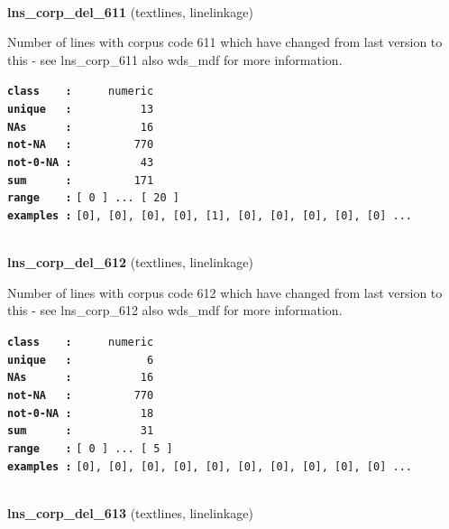 \documentclass[]{article}
\begin{document}
~

\textbf{lns\_corp\_del\_611} (textlines, linelinkage)

Number of lines with corpus code 611 which have changed from last
version to this - see lns\_corp\_611 also wds\_mdf for more information.

\textbf{\texttt{class\ \ \ \ :}} \texttt{~~~~~numeric}\\
\textbf{\texttt{unique\ \ \ :}} \texttt{~~~~~~~~~~13}\\
\textbf{\texttt{NAs\ \ \ \ \ \ :}} \texttt{~~~~~~~~~~16}\\
\textbf{\texttt{not-NA\ \ \ :}} \texttt{~~~~~~~~~770}\\
\textbf{\texttt{not-0-NA\ :}} \texttt{~~~~~~~~~~43}\\
\textbf{\texttt{sum\ \ \ \ \ \ :}} \texttt{~~~~~~~~~171}\\
\textbf{\texttt{range\ \ \ \ :}}
\texttt{{[}\ 0\ {]}\ ...\ {[}\ 20\ {]}}\\
\textbf{\texttt{examples\ :}}
\texttt{{[}0{]},\ {[}0{]},\ {[}0{]},\ {[}0{]},\ {[}1{]},\ {[}0{]},\ {[}0{]},\ {[}0{]},\ {[}0{]},\ {[}0{]}\ ...}\\

~

\textbf{lns\_corp\_del\_612} (textlines, linelinkage)

Number of lines with corpus code 612 which have changed from last
version to this - see lns\_corp\_612 also wds\_mdf for more information.

\textbf{\texttt{class\ \ \ \ :}} \texttt{~~~~~numeric}\\
\textbf{\texttt{unique\ \ \ :}} \texttt{~~~~~~~~~~~6}\\
\textbf{\texttt{NAs\ \ \ \ \ \ :}} \texttt{~~~~~~~~~~16}\\
\textbf{\texttt{not-NA\ \ \ :}} \texttt{~~~~~~~~~770}\\
\textbf{\texttt{not-0-NA\ :}} \texttt{~~~~~~~~~~18}\\
\textbf{\texttt{sum\ \ \ \ \ \ :}} \texttt{~~~~~~~~~~31}\\
\textbf{\texttt{range\ \ \ \ :}}
\texttt{{[}\ 0\ {]}\ ...\ {[}\ 5\ {]}}\\
\textbf{\texttt{examples\ :}}
\texttt{{[}0{]},\ {[}0{]},\ {[}0{]},\ {[}0{]},\ {[}0{]},\ {[}0{]},\ {[}0{]},\ {[}0{]},\ {[}0{]},\ {[}0{]}\ ...}\\

~

\textbf{lns\_corp\_del\_613} (textlines, linelinkage)
\end{document}
